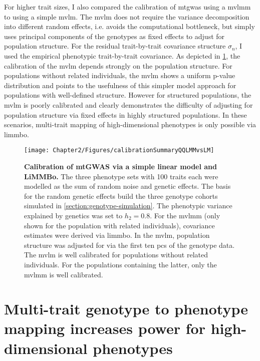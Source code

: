 For higher trait sizes, I also compared the calibration of \gls{mtgwas} using a \gls{mvlmm} to using a simple \gls{mvlm}. The \gls{mvlm} does not require the variance decomposition into different random effects, i.e. avoids the computational bottleneck, but simply uses principal components of the genotypes as fixed effects to adjust for population structure. For the residual trait-by-trait covariance structure \(\sigma_n\), I used the empirical phenotypic trait-by-trait covariance. As depicted in \cref{fig:calibration-LM}, the calibration of the \gls{mvlm} depends strongly on the population structure. For populations without related individuals, the \gls{mvlm} shows a uniform p-value distribution and points to the usefulness of this simpler model approach for populations with well-defined structure. However for structured populations, the \gls{mvlm} is poorly calibrated and clearly demonstrates the difficulty of adjusting for population structure via fixed effects in highly structured populations. In these scenarios, multi-trait mapping of high-dimensional phenotypes is only possible via \gls{limmbo}. 
%
\begin{figure}[h!]
	\centering	
	\texttt{[image: Chapter2/Figures/calibrationSummaryQQLMMvsLM]}\\
	\caption[\textbf{Calibration of mtGWAS via a simple linear model and a linear mixed model. }]{\textbf{Calibration of mtGWAS via a simple linear model and LiMMBo.} The three phenotype sets with \num{100} traits each were modelled as the sum of random noise and genetic effects. The basis for the random genetic effects build the three genotype cohorts simulated in \cref{section:genotype-simulation}. The phenotypic variance explained by genetics was set to \(h_2=0.8\). For the \gls{mvlmm} (only shown for the population with related individuals), covariance estimates were derived via \gls{limmbo}. In the \gls{mvlm}, population structure was adjusted for via the first ten \glspl{pc} of the genotype data. The \gls{mvlm} is well calibrated for populations without related individuals. For the populations containing the latter, only the \gls{mvlmm} is well calibrated. }
	  \label{fig:calibration-LM}%
\end{figure}

\section{Multi-trait genotype to phenotype mapping increases power for high-dimensional phenotypes}
\label{section:power-limmbo}

